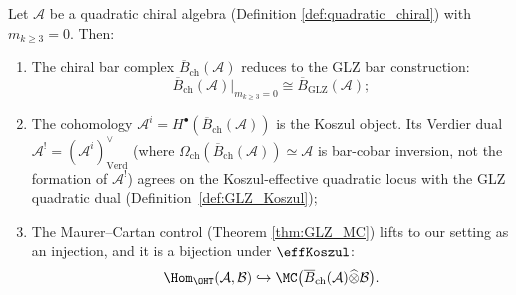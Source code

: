 \begin{theorem}
\label{thm:GLZ_compatibility}
Let $\mathcal{A}$ be a quadratic chiral algebra (Definition \ref{def:quadratic_chiral}) with $m_{k \geq 3} = 0$. Then:
\begin{enumerate}[label=(\roman*)]
\item The chiral bar complex $\overline{B}_{\text{ch}}(\mathcal{A})$ reduces to the GLZ bar construction:
\begin{equation}
\overline{B}_{\text{ch}}(\mathcal{A})|_{m_{k \geq 3} = 0} \cong \overline{B}_{\text{GLZ}}(\mathcal{A});
\end{equation}

\item The cohomology
$\mathcal{A}^i = H^\bullet(\overline{B}_{\text{ch}}(\mathcal{A}))$
is the Koszul object. Its Verdier dual
$\mathcal{A}^! = (\mathcal{A}^i)^\vee_{\mathrm{Verd}}$
\textup{(}where
$\Omega_{\text{ch}}(\overline{B}_{\text{ch}}(\mathcal{A}))
\simeq \mathcal{A}$ is bar-cobar inversion, not the formation of
$\mathcal{A}^!$\textup{)}
agrees on the Koszul-effective quadratic locus with the GLZ
quadratic dual (Definition~\ref{def:GLZ_Koszul});

\item The Maurer--Cartan control (Theorem \ref{thm:GLZ_MC}) lifts to
our setting as an injection, and it is a bijection under
$\effKoszul$:
\begin{equation}
\Hom_{\OHT}(\mathcal{A}, \mathcal{B}) \hookrightarrow
\MC\big(\overline{B}_{\text{ch}}(\mathcal{A}) \widehat{\otimes}
\mathcal{B}\big).
\end{equation}
\end{enumerate}
\end{theorem}

